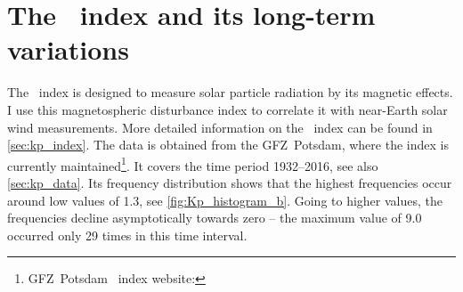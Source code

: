 \section{The \Kp~index and its long-term variations}
\label{sec:kp_long_term_variations}
The \Kp~index is designed to measure solar particle radiation by its magnetic effects. I use this magnetospheric disturbance index to correlate it with near-Earth solar wind measurements. More detailed information on the \Kp~index can be found in \autoref{sec:kp_index}.
The \Kp{} data is obtained from the GFZ~Potsdam, where the index is currently maintained\footnote{GFZ~Potsdam \Kp~index website: }. It covers the time period 1932--2016, see also \autoref{sec:kp_data}. Its frequency distribution shows that the highest frequencies occur around low \Kp{} values of \num{1.3}, see \autoref{fig:Kp_histogram_b}. Going to higher \Kp{} values, the frequencies decline asymptotically towards zero -- the maximum \Kp{} value of \num{9.0} occurred only 29 times in this time interval.
